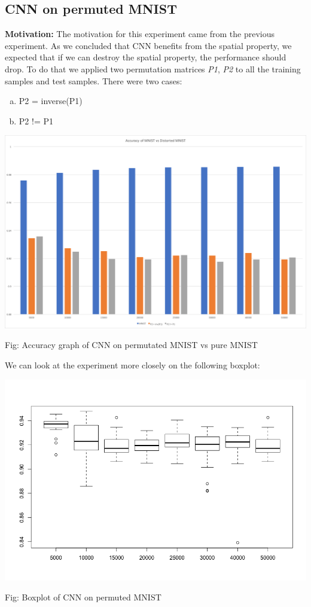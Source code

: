 \documentclass{article}
\begin{document}
\subsection*{CNN on permuted MNIST}
\textbf{Motivation:} The motivation for this experiment came from the previous experiment. As we concluded that CNN benefits from the spatial property, we expected that if we can destroy the spatial property, the performance should drop. To do that we applied two permutation matrices \textit{P1}, \textit{P2} to all the training samples and test samples. There were two cases:
\begin{enumerate} [a.]
	\item P2 = inverse(P1)
	\item P2 != P1
\end{enumerate}
\begin{center}
	\includegraphics[scale=0.3]{Accuracy_graph}
\end{center}
\begin{center}
	Fig: Accuracy graph of CNN on permutated MNIST vs pure MNIST
\end{center}
We can look at the experiment more closely on the following boxplot:
\begin{center}
	\includegraphics[scale=0.35]{mnist_permutated_cnn}
\end{center}
\begin{center}
	Fig: Boxplot of CNN on permuted MNIST
\end{center}
\end{document}
